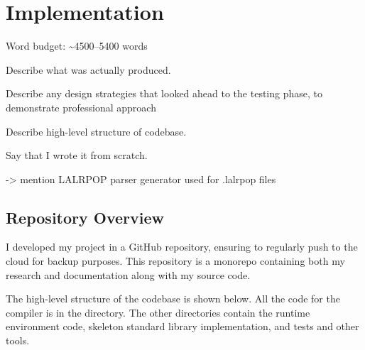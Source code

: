 \documentclass[00-main.tex]{subfiles}
\begin{document}
\chapter{Implementation}

\begin{mrwComment}
Word budget: \textasciitilde 4500--5400 words
\end{mrwComment}

\begin{mrwComment}
Describe what was actually produced.

Describe any design strategies that looked ahead to the testing phase, to demonstrate professional approach
\end{mrwComment}
\begin{mrwComment}
Describe high-level structure of codebase.

Say that I wrote it from scratch.

-> mention LALRPOP parser generator used for .lalrpop files
\end{mrwComment}

\section{Repository Overview}

I developed my project in a GitHub repository, ensuring to regularly push to the cloud for backup purposes.
This repository is a monorepo containing both my research and documentation along with my source code.

The high-level structure of the codebase is shown below.
All the code for the compiler is in the  directory.
The other directories contain the runtime environment code, skeleton standard library implementation, and tests and other tools.

\newlength\IndentWidth
\setlength\IndentWidth{1em}
\end{document}
